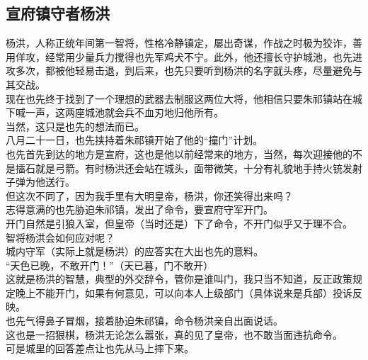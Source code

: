 \begin{multicols}{\theparacolNo}
\subsection{宣府镇守者杨洪}
杨洪，人称正统年间第一智将，性格冷静镇定，屡出奇谋，作战之时极为狡诈，善用佯攻，经常用少量兵力搅得也先军鸡犬不宁。此外，他还擅长守护城池，也先进攻多次，都被他轻易击退，到后来，也先只要听到杨洪的名字就头疼，尽量避免与其交战。\\

现在也先终于找到了一个理想的武器去制服这两位大将，他相信只要朱祁镇站在城下喊一声，这两座城池就会兵不血刃地归他所有。\\

当然，这只是也先的想法而已。\\

八月二十一日，也先挟持着朱祁镇开始了他的“撞门”计划。\\

也先首先到达的地方是宣府，这也是他以前经常来的地方，当然，每次迎接他的不是擂石就是弓箭。有时杨洪还会站在城头，面带微笑，十分有礼貌地手持火铳发射子弹为他送行。\\

但这次不同了，因为我手里有大明皇帝，杨洪，你还笑得出来吗？\\

志得意满的也先胁迫朱祁镇，发出了命令，要宣府守军开门。\\

开门自然是引狼入室，但皇帝（当时还是）下了命令，不开门似乎又于理不合。\\

智将杨洪会如何应对呢？\\

城内守军（实际上就是杨洪）的应答实在大出也先的意料。\\

“天色已晚，不敢开门！”（天已暮，门不敢开）\\

这就是杨洪的智慧，典型的外交辞令，管你是谁叫门，我只当不知道，反正政策规定晚上不能开门，如果有何意见，可以向本人上级部门（具体说来是兵部）投诉反映。\\

也先气得鼻子冒烟，接着胁迫朱祁镇，命令杨洪亲自出面说话。\\

这也是一招狠棋，杨洪无论怎么嚣张，真的见了皇帝，也不敢当面违抗命令。\\

可是城里的回答差点让也先从马上摔下来。\\


\end{multicols}
